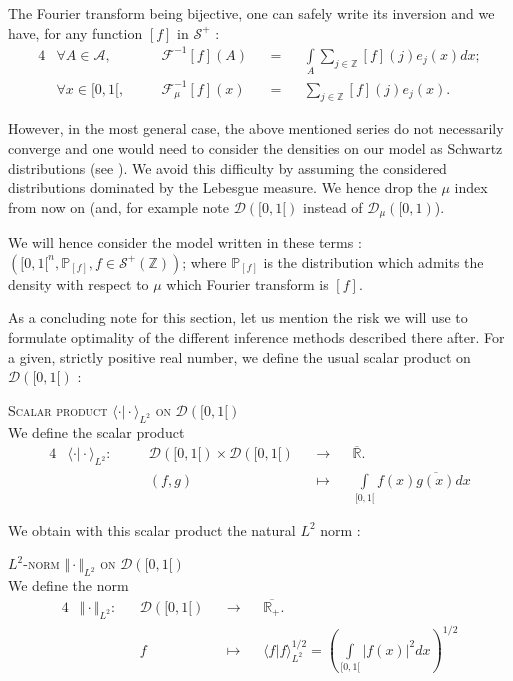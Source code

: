 The Fourier transform being bijective, one can safely write its inversion and we have, for any function $[f]$ in $\mathcal{S}^{+}$ :
\begin{alignat*}{4}
&\forall A \in \mathcal{A},&& \quad \mathcal{F}^{-1}[f](A) &&=&& \int\limits_{A}\sum\limits_{j \in \mathds{Z}} [f](j)e_{j}(x)dx;\\
&\forall x \in [0, 1[,&& \quad \mathcal{F}_{\mu}^{-1}[f](x) &&=&& \sum\limits_{j \in \mathds{Z}} [f](j)e_{j}(x).
\end{alignat*}

However, in the most general case, the above mentioned series do not necessarily converge and one would need to consider the densities on our model as Schwartz distributions (see ).
We avoid this difficulty by assuming the considered distributions dominated by the Lebesgue measure.
We hence drop the $\mu$ index from now on (and, for example note $\mathcal{D}([0,1[)$ instead of $\mathcal{D}_{\mu}([0, 1)$).

We will hence consider the model written in these terms : $\left([0, 1[^{n}, \mathds{P}_{[f]}, f \in \mathcal{S}^{+}(\mathds{Z})\right)$; where $\mathds{P}_{[f]}$ is the distribution which admits the density with respect to $\mu$ which Fourier transform is $[f]$.

\medskip

As a concluding note for this section, let us mention the risk we will use to formulate optimality of the different inference methods described there after.
For a given, strictly positive real number, we define the usual scalar product on $\mathcal{D}([0,1[)$ :

\begin{de}{\textsc{Scalar product $\langle \cdot \vert \cdot\rangle_{L^{2}}$ on $\mathcal{D}([0,1[)$}\\}\label{de1.4.4}
We define the scalar product
\begin{alignat*}{4}
& \langle \cdot \vert \cdot \rangle_{L^{2}} : && \quad \mathcal{D}([0,1[) \times \mathcal{D}([0,1[) && \rightarrow && \overline{\mathds{R}}.\\
& && \quad (f, g) && \mapsto && \int\limits_{[0, 1[} f(x) \overline{g(x)} dx
\end{alignat*}
\end{de}

We obtain with this scalar product the natural $L^{2}$ norm :
\begin{de}{\textsc{$L^{2}$-norm $\Vert \cdot \Vert_{L^{2}}$ on $\mathcal{D}([0,1[)$}\\}\label{de1.4.5}
We define the norm
\begin{alignat*}{4}
& \Vert \cdot \Vert_{L^{2}} : && \mathcal{D}([0,1[) && \rightarrow && \overline{\mathds{R}_{+}}.\\
& && f && \mapsto && \langle f \vert f \rangle_{L^{2}}^{1/2} = \left(\int\limits_{[0, 1[} \vert f(x)\vert^{2} dx\right)^{1/2}
\end{alignat*}
\end{de}

